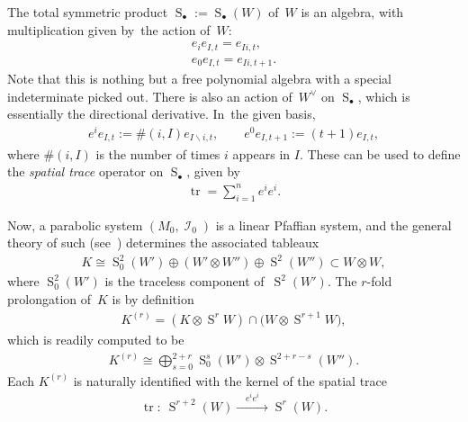 \documentclass[pdftex]{sigma}
\DeclareMathOperator{\Sym}{S}
\DeclareMathOperator{\tr}{tr}
\DeclareMathOperator{\I}{\mathcal{I}}
\numberwithin{equation}{section}
\begin{document}
The total symmetric product $\Sym_\bullet := \Sym_\bullet(W)$ of~$W$ is an algebra, with multiplication given by~the action of~$W$:
\begin{gather*}
 e_i e_{I,t} = e_{Ii,t} ,
 \\
 e_0 e_{I,t} = e_{Ii,t+1} .
\end{gather*}
Note that this is nothing but a free polynomial algebra with a special indeterminate picked out.
There is also an action of~$W^\vee$ on $\Sym_\bullet$, which is essentially the directional derivative. In~the given basis,
\begin{gather*}
 e^i e_{I,t} := \#(i,I) e_{I\backslash i,t}, \qquad
 e^0 e_{I,t+1} := (t+1) e_{I,t} ,
\end{gather*}
where $\#(i,I)$ is the number of times $i$ appears in $I$.
These can be used to define the \emph{spatial trace} operator on $\Sym_\bullet$, given by
\begin{gather*}
\tr = \sum_{i=1}^n e^ie^i .
\end{gather*}

Now, a parabolic system $(M_0, \I_0)$ is a linear Pfaffian system, and the general theory of such (see~\cite[Chapter~IV]{BCGGG}) determines the associated tableaux
\begin{gather*}
K \cong \Sym^2_0 (W') \oplus (W'\otimes W'') \oplus \Sym^2 (W'') \subset W \otimes W ,
\end{gather*}
where $\Sym^2_0 (W')$ is the traceless component of~$\Sym^2 (W')$.
The $r$-fold prolongation of~$K$ is by definition
\begin{gather*}
K^{(r)} = (K\otimes \Sym^r W) \cap \big(W \otimes \Sym^{r+1} W\big) ,
\end{gather*}
which is readily computed to be
\begin{gather*}
K^{(r)} \cong \bigoplus_{s = 0}^{2 + r} \Sym^s_0 (W') \otimes \Sym^{2 + r - s} (W'') .
\end{gather*}
Each $K^{(r)}$ is naturally identified with the kernel of the spatial trace
\begin{gather*}
 \tr \colon\ \Sym^{r+2}(W) \xrightarrow{\quad e^{i}e^i \quad} \Sym^{r}(W) .
\end{gather*}
\end{document}
